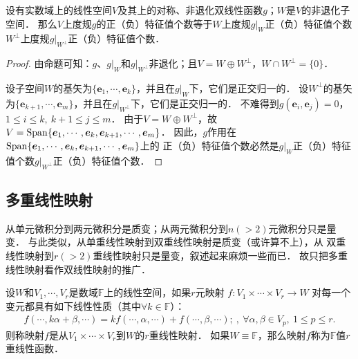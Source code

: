 \begin{proposition}
    设有实数域上的线性空间$V$及其上的对称、非退化双线性函数$g$；$W$是$V$的非退化子空间．
    那么$V$上度规$g$的正（负）特征值个数等于$W$上度规$g|_W$正（负）特征值个数
    $W^\perp$上度规$g|_{W^\perp}$正（负）特征值个数．
\end{proposition}
\begin{proof}
    由命题可知：$g$、$g|_W$和$g|_{W^\perp}$非退化；且$V=W\oplus W^\perp$，$W\cap W^\perp=\{0\}$．
    
    设子空间$W$的基矢为$\{\boldsymbol{e}_1,\cdots,\boldsymbol{e}_k\}$，并且在$g|_W$下，它们是正交归一的．
    设$W^\perp$的基矢为$\{\boldsymbol{e}_{k+1},\cdots,\boldsymbol{e}_m\}$，并且在$g|_{W^\perp}$下，它们是正交归一的．
    不难得到$g(\boldsymbol{e}_i,\boldsymbol{e}_j)=0$，$1\leqslant i\leqslant k,\ k+1 \leqslant j \leqslant m $．    
    由于$V=W\oplus W^\perp$，故$V={\rm Span}\{\boldsymbol{e}_1,\cdots,\boldsymbol{e}_k,\boldsymbol{e}_{k+1},\cdots,\boldsymbol{e}_m\}$．
    因此，$g$作用在${\rm Span}\{\boldsymbol{e}_1,\cdots,\boldsymbol{e}_k,\boldsymbol{e}_{k+1},\cdots,\boldsymbol{e}_m\}$上的
    正（负）特征值个数必然是$g|_W$正（负）特征值个数$g|_{W^\perp}$正（负）特征值个数．
\end{proof}









\subsection{多重线性映射}\label{chmla:sec_multi-linear-function}
从单元微积分到两元微积分是质变；从两元微积分到$n(>2)$元微积分只是量变．
与此类似，从单重线性映射到双重线性映射是质变（或许算不上），从
双重线性映射到$r(>2)$重线性映射只是量变，叙述起来麻烦一些而已．
故只把多重线性映射看作双线性映射的推广．
\begin{definition}\label{chmla:def_nlinear-fun}
    设$W$和$V_1,\cdots,V_r$是数域$\mathbb{F}$上的线性空间，如果$r$元映射
    $f:V_1 \times  \cdots \times V_r \to W$
    对每一个变元都具有如下线性性质（其中$\forall k \in \mathbb{F}$）： 
    \begin{align*}
        f(\cdots, k\alpha+\beta, \cdots )= k f(\cdots,\alpha,\cdots) + f(\cdots,\beta,\cdots);
        \ , \ \forall \alpha,\beta \in V_p ,  \  1 \leqslant p \leqslant r.
    \end{align*}
    则称映射$f$是从$V_1 \times  \cdots \times V_r$到$W$的$r${\heiti 重线性映射}．
    如果$W\equiv \mathbb{F}$，那么映射$f$称为$\mathbb{F}$值$r${\heiti 重线性函数}．
\end{definition}

